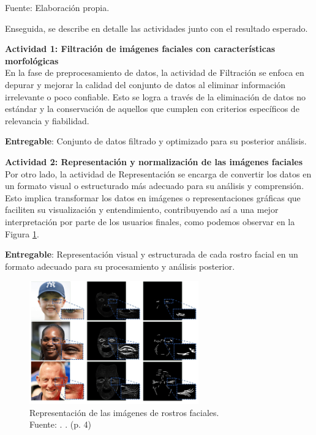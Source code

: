 \begin{flushleft}
	\small Fuente: Elaboración propia.
\end{flushleft}

Enseguida, se describe en detalle las actividades junto con el resultado esperado.

\textbf{Actividad 1: Filtración de imágenes faciales con características morfológicas}
\\
En la fase de preprocesamiento de datos, la actividad de Filtración se enfoca en depurar y mejorar la calidad del conjunto de datos al eliminar información irrelevante o poco confiable. Esto se logra a través de la eliminación de datos no estándar y la conservación de aquellos que cumplen con criterios específicos de relevancia y fiabilidad. 

\textbf{Entregable}: Conjunto de datos filtrado y optimizado para su posterior análisis.

\textbf{Actividad 2: Representación y normalización de las imágenes faciales}
\\
Por otro lado, la actividad de Representación se encarga de convertir los datos en un formato visual o estructurado más adecuado para su análisis y comprensión. Esto implica transformar los datos en imágenes o representaciones gráficas que faciliten su visualización y entendimiento, contribuyendo así a una mejor interpretación por parte de los usuarios finales, como podemos observar en la Figura \ref{3:fig4}.

\textbf{Entregable}: Representación visual y estructurada de cada rostro facial en un formato adecuado para su procesamiento y análisis posterior.

\begin{figure}[h]
     \begin{center}
         \includegraphics[width=0.65\textwidth]{3/figures/repres imagenes.png}
         \caption[Representación de las imágenes de rostros faciales]{Representación de las imágenes de rostros faciales.\\
         Fuente: \cite{moon2024dermatology}. . (p. 4)}
         \label{3:fig4}
     \end{center}
 \end{figure}


